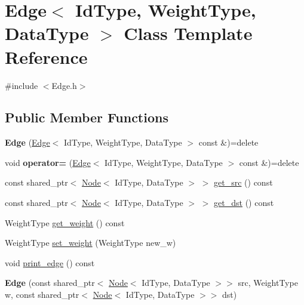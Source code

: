 \hypertarget{class_edge}{}\section{Edge$<$ Id\+Type, Weight\+Type, Data\+Type $>$ Class Template Reference}
\label{class_edge}


{\ttfamily \#include $<$Edge.\+h$>$}

\subsection*{Public Member Functions}
\begin{DoxyCompactItemize}
\item 
\mbox{\label{class_edge_a9892b8e9478ee83a1fdf928b41bfb94d}} 
{\bfseries Edge} (\hyperlink{class_edge}{Edge}$<$ Id\+Type, Weight\+Type, Data\+Type $>$ const \&)=delete
\item 
\mbox{\label{class_edge_a68df5635b8c0f7deea2b8f770a9c8e24}} 
void {\bfseries operator=} (\hyperlink{class_edge}{Edge}$<$ Id\+Type, Weight\+Type, Data\+Type $>$ const \&)=delete
\item 
const shared\+\_\+ptr$<$ \hyperlink{class_node}{Node}$<$ Id\+Type, Data\+Type $>$ $>$ \hyperlink{class_edge_a4deca3bdaa548c96f9677fbae2bd3f4f}{get\+\_\+src} () const
\item 
const shared\+\_\+ptr$<$ \hyperlink{class_node}{Node}$<$ Id\+Type, Data\+Type $>$ $>$ \hyperlink{class_edge_aeb09ab0156b04b4de3fc5cc100e39c82}{get\+\_\+dst} () const
\item 
Weight\+Type \hyperlink{class_edge_a9974565bdcddde77cf1935556170a485}{get\+\_\+weight} () const
\item 
Weight\+Type \hyperlink{class_edge_a71ab746404c0b7141b80f07e8e2e8837}{set\+\_\+weight} (Weight\+Type new\+\_\+w)
\item 
void \hyperlink{class_edge_acfcab535ffd0b064765fb2096633c246}{print\+\_\+edge} () const
\item 
\mbox{\label{class_edge_ad96419484eb8163ced27d07c7ca11f9f}} 
{\bfseries Edge} (const shared\+\_\+ptr$<$ \hyperlink{class_node}{Node}$<$ Id\+Type, Data\+Type $>$$>$ src, Weight\+Type w, const shared\+\_\+ptr$<$ \hyperlink{class_node}{Node}$<$ Id\+Type, Data\+Type $>$$>$ dst)
\end{DoxyCompactItemize}
